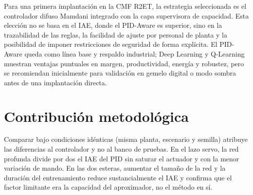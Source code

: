 Para una primera implantación en la CMF R2ET, la estrategia seleccionada es el controlador difuso Mamdani integrado con la capa supervisora de capacidad. Esta elección no se basa en el IAE, donde el PID-Aware es superior, sino en la trazabilidad de las reglas, la facilidad de ajuste por personal de planta y la posibilidad de imponer restricciones de seguridad de forma explícita. El PID-Aware queda como línea base y respaldo industrial; Deep Learning y Q-Learning muestran ventajas puntuales en margen, productividad, energía y robustez, pero se recomiendan inicialmente para validación en gemelo digital o modo sombra antes de una implantación directa.

\section*{Contribución metodológica}

Comparar bajo condiciones idénticas (misma planta, escenario y semilla) atribuye las diferencias al controlador y no al banco de pruebas. En el lazo servo, la red profunda divide por dos el IAE del PID sin saturar el actuador y con la menor variación de mando. En las dos esteras, aumentar el tamaño de la red y la duración del entrenamiento reduce sustancialmente el IAE y confirma que el factor limitante era la capacidad del aproximador, no el método en sí.
